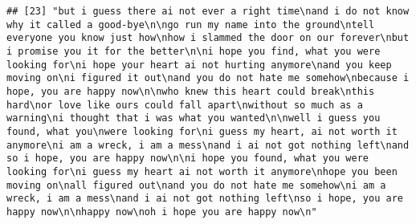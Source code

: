 \documentclass[]{article}
\begin{document}
\begin{verbatim}
## [23] "but i guess there ai not ever a right time\nand i do not know why it called a good-bye\n\ngo run my name into the ground\ntell everyone you know just how\nhow i slammed the door on our forever\nbut i promise you it for the better\n\ni hope you find, what you were looking for\ni hope your heart ai not hurting anymore\nand you keep moving on\ni figured it out\nand you do not hate me somehow\nbecause i hope, you are happy now\n\nwho knew this heart could break\nthis hard\nor love like ours could fall apart\nwithout so much as a warning\ni thought that i was what you wanted\n\nwell i guess you found, what you\nwere looking for\ni guess my heart, ai not worth it anymore\ni am a wreck, i am a mess\nand i ai not got nothing left\nand so i hope, you are happy now\n\ni hope you found, what you were looking for\ni guess my heart ai not worth it anymore\nhope you been moving on\nall figured out\nand you do not hate me somehow\ni am a wreck, i am a mess\nand i ai not got nothing left\nso i hope, you are happy now\n\nhappy now\noh i hope you are happy now\n"                                                                                                                                                                                                                                                                                                                                                                                                                                                                                                                                                                                                                                                                                                                                                                                                                                                                                                                                                                                                                                                                                                                                                                                                                                                                                                                                                                                                                                                                                                                                                                                                                                                                                                                                                                                                                                                                             

\end{verbatim}
\end{document}
